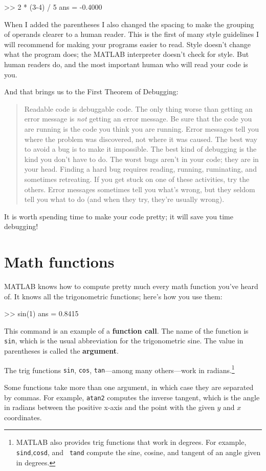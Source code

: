 \documentclass[
]{book}
\numberwithin{Answer}{chapter}
\numberwithin{Exercise}{chapter}
\newcommand{\displaythrm}[1]{%
    \ifthenelse{\equal{#1}{1}}%
        {Readable code is debuggable code.}{%
    \ifthenelse{\equal{#1}{2}}%
        {The only thing worse than getting an error message is {\em
         not} getting an error message.}{%
    \ifthenelse{\equal{#1}{3}}%
        {Be sure that the code you are running
         is the code you think you are running.}{%
    \ifthenelse{\equal{#1}{4}}%
        {Error messages tell you where the problem was discovered,
         not where it was caused.}{%
    \ifthenelse{\equal{#1}{5}}%
        {The best way to avoid a bug is to make it impossible.}{%
    \ifthenelse{\equal{#1}{6}}%
        {The best kind of debugging is the kind you don't have to do.}{%
    \ifthenelse{\equal{#1}{7}}%
        {The worst bugs aren't in your code; they are in your head.}{%
    \ifthenelse{\equal{#1}{8}}%
        {Finding a hard bug requires reading, running, ruminating,
         and sometimes retreating.  If you get stuck on one of these
         activities, try the others.}{%
    \ifthenelse{\equal{#1}{9}}%
        {Error messages sometimes tell you what's wrong, but they
         seldom tell you what to do (and when they try, they're usually
         wrong).}{%
    {}%
}}}}}}}}}}%
\begin{document}
\begin{code}
>> 2 * (3-4) / 5
ans = -0.4000
\end{code}

When I added the parentheses I also changed the spacing to make the
grouping of operands clearer to a human reader.  This is the first
of many style guidelines I will recommend for making your programs
easier to read.  Style doesn't change what the program does; the MATLAB
interpreter doesn't check for style.  But human readers do, and the
most important human who will read your code is you.


And that brings us to the First Theorem of Debugging:

\begin{quote}
\displaythrm{1}
\end{quote}

It is worth spending time to make your code pretty; it will save
you time debugging!


\section{Math functions}

MATLAB knows how to compute pretty much every math function you've
heard of.  It knows all the trigonometric functions; here's how you
use them:


\begin{code}
>> sin(1)
ans = 0.8415
\end{code}

This command is an example of a {\bf function call}.  The name of the
function is {\tt sin}, which is the usual abbreviation for the
trigonometric sine.  The value in parentheses is called the {\bf argument}.


The trig functions {\tt sin}, {\tt cos}, {\tt tan}---among many
others---work in radians.\footnote{MATLAB also provides trig functions
that work in degrees. For example, {\tt sind},{\tt cosd}, and {\tt
tand} compute the sine, cosine, and tangent of an angle given in
degrees.}

Some functions take more than one argument, in which case they are
separated by commas.  For example, {\tt atan2} computes the inverse
tangent, which is the angle in radians between the positive x-axis and
the point with the given $y$ and $x$ coordinates.
\end{document}
